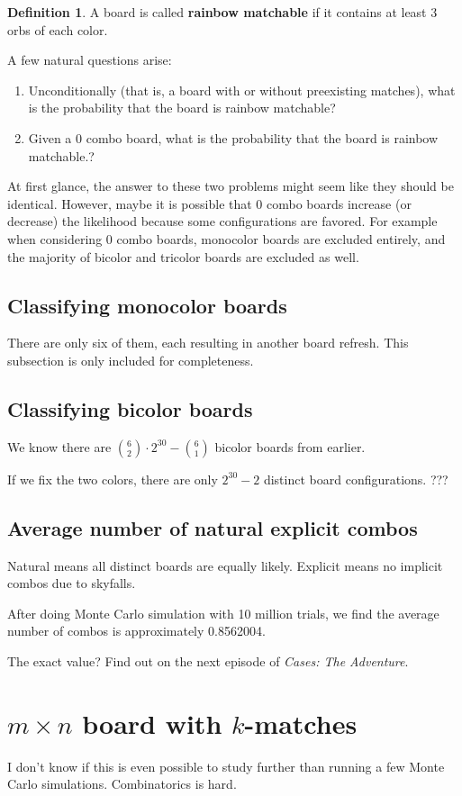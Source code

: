 \documentclass[12pt]{article}
\theoremstyle{definition}
\newtheorem{definition}{Definition}[section]
\begin{document}
\begin{definition}
    A board is called \textbf{rainbow matchable} if it contains at least 3 orbs of each color.
\end{definition}

A few natural questions arise:
\begin{enumerate}
    \item Unconditionally (that is, a board with or without preexisting matches), what is the probability that the board is rainbow matchable?
    \item Given a 0 combo board, what is the probability that the board is rainbow matchable.?
\end{enumerate}
At first glance, the answer to these two problems might seem like they should be identical. However, maybe it is possible that 0 combo boards increase (or decrease) the likelihood because some configurations are favored. For example when considering 0 combo boards, monocolor boards are excluded entirely, and the majority of bicolor and tricolor boards are excluded as well.
\subsection{Classifying monocolor boards}
There are only six of them, each resulting in another board refresh. This subsection is only included for completeness.
\subsection{Classifying bicolor boards}
We know there are $\binom{6}{2}\cdot 2^{30}-\binom{6}{1}$ bicolor boards from earlier.

If we fix the two colors, there are only $2^{30}-2$ distinct board configurations. ???
\subsection{Average number of natural explicit combos}
Natural means all distinct boards are equally likely. Explicit means no implicit combos due to skyfalls.

After doing Monte Carlo simulation with 10 million trials, we find the average number of combos is approximately 0.8562004.

The exact value? Find out on the next episode of \textit{Cases: The Adventure}.
\section{$m\times n$ board with $k$-matches}
I don't know if this is even possible to study further than running a few Monte Carlo simulations. Combinatorics is hard.
\end{document}
